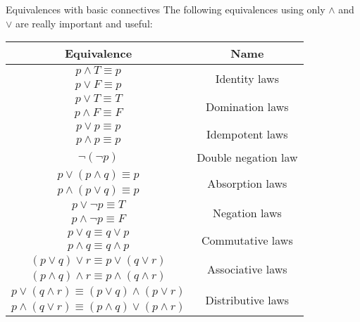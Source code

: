 \documentclass{article}
\begin{document}
\begin{parag}{Equivalences with basic connectives}
    The following equivalences using only $\land$ and $\lor$ are really important and useful:
    \begin{center}
    \begin{tabular}{|c|c|}
        \hline
        \textbf{Equivalence} & \textbf{Name} \\
        \hline
        \hline
        $p \land T \equiv p$ & \multirow{2}{*}{Identity laws} \\
        $p \lor F \equiv p$ & \\
        \hline
        $p \lor T \equiv T$ & \multirow{2}{*}{Domination laws} \\
        $p \land F \equiv F$ & \\
        \hline
        $p \lor p \equiv p$ & \multirow{2}{*}{Idempotent laws} \\
        $p \land p \equiv p$ & \\
        \hline
        $\lnot\left(\lnot p\right)$ & Double negation law \\
        \hline
        \hline
        $p \lor \left(p \land q\right) \equiv p$ & \multirow{2}{*}{Absorption laws} \\
        $p \land \left(p \lor q\right) \equiv p$ & \\
        \hline
        $p \lor \lnot p \equiv T$ & \multirow{2}{*}{Negation laws} \\
        $p \land \lnot p \equiv F$ & \\
        \hline
        \hline
        $p \lor q \equiv q \lor p$ & \multirow{2}{*}{Commutative laws} \\
        $p \land q \equiv q \land p$ & \\
        \hline
        $\left(p \lor q\right) \lor r \equiv p \lor \left(q \lor r\right)$ & \multirow{2}{*}{Associative laws} \\
        $\left(p \land q\right) \land r \equiv p \land \left(q \land r\right)$ & \\
        \hline
        $p \lor \left(q \land r\right) \equiv \left(p \lor q\right) \land \left(p \lor r\right)$ & \multirow{2}{*}{Distributive laws} \\
        $p \land \left(q \lor r\right) \equiv \left(p \land q\right) \lor \left(p \land r\right)$ & \\
        \hline
    \end{tabular}
    \end{center}
\end{parag}
\end{document}
